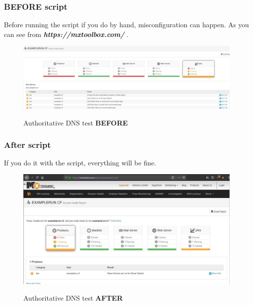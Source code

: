 \subsubsection{BEFORE script}
Before running the script if you do by hand, misconfiguration can happen. As you can see from \textbf{\textit{https://mxtoolbox.com/}} \cite{mxtoolbox}.
\begin{figure}[H]
	\centering
	\includegraphics[width=1\linewidth]{pics/mxtool_before_test}
	\label{fig:mxtoolbeforetest}
			\caption{Authoritative DNS test \textbf{BEFORE}}
\end{figure}

\subsubsection{After script}
If you do it with the script, everything will be fine.
\begin{figure}[H]
	\centering
	\includegraphics[width=1\linewidth]{pics/mxtool_after_test}
	\label{fig:mxtoolaftertest}
			\caption{Authoritative DNS test \textbf{AFTER}}
\end{figure}
\newpage
